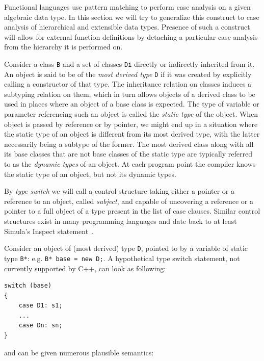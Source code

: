\documentclass[preprint]{sigplanconf}
\makeatletter
\DeclareRobustCommand{\code}[1]{{\lstinline[breaklines=false,escapechar=@]{#1}}}
\makeatother
\begin{document}
Functional languages use pattern matching to perform case analysis on a given 
algebraic data type. In this section we will try to generalize this construct to 
case analysis of hierarchical and extensible data types. Presence of such a
construct will allow for external function definitions by detaching a particular 
case analysis from the hierarchy it is performed on.

Consider a class \code{B} and a set of classes \code{Di} directly or indirectly 
inherited from it. An object is said to be of the \emph{most derived type} 
\code{D} if it was created by explicitly calling a constructor of that type.
The inheritance relation on classes induces a subtyping relation on them, which in 
turn allows objects of a derived class to be used in places where an object of a 
base class is expected. The type of variable or parameter referencing such an
object is called the \emph{static type} of the object. When object is passed by 
reference or by pointer, we might end up in a situation where the static type of an 
object is different from its most derived type, with the latter necessarily 
being a subtype of the former. The most derived class along with all its base classes 
that are not base classes of the static type are typically referred to as the 
\emph{dynamic types} of an object. At each program point the compiler knows the 
static type of an object, but not its dynamic types.

By \emph{type switch} we will call a control structure taking either a pointer 
or a reference to an object, called \emph{subject}, and capable of uncovering a 
reference or a pointer to a full object of a type present in the list of case 
clauses. Similar control structures exist in many programming languages and 
date back to at least Simula's Inspect statement~\cite{Simula67}.

Consider an object of (most derived) type \code{D}, pointed to by a variable of 
static type \code{B*}: e.g. \code{B* base = new D;}. A hypothetical type switch 
statement, not currently supported by C++, can look as following:

\begin{lstlisting}
switch (base)
{
    case D1: s1;
    ...
    case Dn: sn;
}
\end{lstlisting}

\noindent and can be given numerous plausible semantics:
\end{document}

